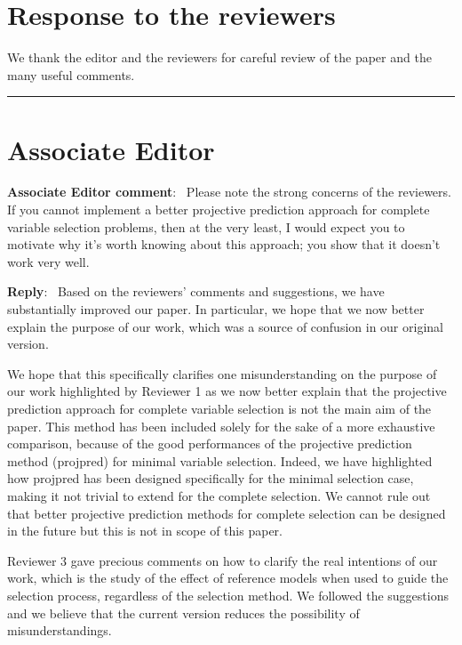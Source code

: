 \documentclass[11pt]{article}
\newcounter{reviewer}
\newenvironment{aecomment}
{\medskip \noindent \begin{sf}\textbf{Associate Editor comment}:\  }
	{\medskip \end{sf}}
\newenvironment{reply}
   {\medskip \noindent \textbf{Reply}:\  }
   {\medskip}
\newcommand{\todo}{\subsection*{\textcolor{red}{To do (comment out when done)}:}}
\begin{document}
\section*{Response to the reviewers}
We thank the editor and the reviewers for careful review of the paper and the many useful comments.
\bigskip 
\hrule
\medskip 
\section*{Associate Editor}

\begin{aecomment}
Please note the strong concerns of the reviewers. If you cannot implement a better projective prediction approach for complete variable selection problems, then at the very least, I would expect you to motivate why it's worth knowing about this approach; you show that it doesn't work very well.
\end{aecomment}

\begin{reply}
Based on the reviewers' comments and suggestions, we have substantially improved our paper. In particular, we hope that we now better explain the purpose of our work, which was a source of confusion in our original version.

We hope that this specifically clarifies one misunderstanding on the purpose of our work highlighted by Reviewer 1 as we now better explain that the projective prediction approach for complete variable selection is not the main aim of the paper. This method has been included solely for the sake of a more exhaustive comparison, because of the good performances of the projective prediction method (projpred) for minimal variable selection. Indeed, we have highlighted how projpred has been designed specifically for the minimal selection case, making it not trivial to extend for the complete selection. We cannot rule out that better projective prediction methods for complete selection can be designed in the future but this is not in scope of this paper. 

Reviewer 3 gave precious comments on how to clarify the real intentions of our work, which is the study of the effect of reference models when used to guide the selection process, regardless of the selection method. We followed the suggestions and we believe that the current version reduces the possibility of misunderstandings.
\end{reply}

\end{document}
